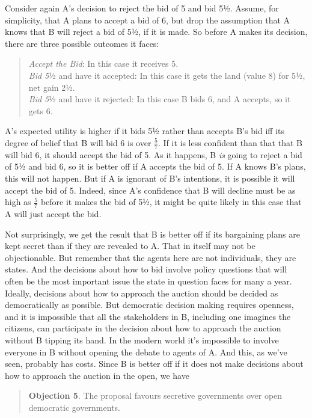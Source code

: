 \documentclass[
  10pt,
  letterpaper,
  DIV=11,
  numbers=noendperiod,
  twoside]{scrartcl}
\begin{document}
Consider again A's decision to reject the bid of 5 and bid 5½. Assume,
for simplicity, that A plans to accept a bid of 6, but drop the
assumption that A knows that B will reject a bid of 5½, if it is made.
So before A makes its decision, there are three possible outcomes it
faces:

\begin{quote}
\emph{Accept the Bid}: In this case it receives 5.\\
\emph{Bid 5}½ and have it accepted: In this case it gets the land (value
8) for 5½, net gain 2½.\\
\emph{Bid 5}½ and have it rejected: In this case B bids 6, and A
accepts, so it gets 6.
\end{quote}

A's expected utility is higher if it bids 5½ rather than accepts B's bid
iff its degree of belief that B will bid 6 is over \(\frac{5}{7}\). If
it is less confident than that that B will bid 6, it should accept the
bid of 5. As it happens, B \emph{is} going to reject a bid of 5½ and bid
6, so it is better off if A accepts the bid of 5. If A knows B's plans,
this will not happen. But if A is ignorant of B's intentions, it is
possible it will accept the bid of 5. Indeed, since A's confidence that
B will decline must be as high as \(\frac{5}{7}\) before it makes the
bid of 5½, it might be quite likely in this case that A will just accept
the bid.

Not surprisingly, we get the result that B is better off if its
bargaining plans are kept secret than if they are revealed to A. That in
itself may not be objectionable. But remember that the agents here are
not individuals, they are states. And the decisions about how to bid
involve policy questions that will often be the most important issue the
state in question faces for many a year. Ideally, decisions about how to
approach the auction should be decided as democratically as possible.
But democratic decision making requires openness, and it is impossible
that all the stakeholders in B, including one imagines the citizens, can
participate in the decision about how to approach the auction without B
tipping its hand. In the modern world it's impossible to involve
everyone in B without opening the debate to agents of A. And this, as
we've seen, probably has costs. Since B is better off if it does not
make decisions about how to approach the auction in the open, we have

\begin{quote}
\textbf{Objection 5}. The proposal favours secretive governments over
open democratic governments.
\end{quote}
\end{document}
